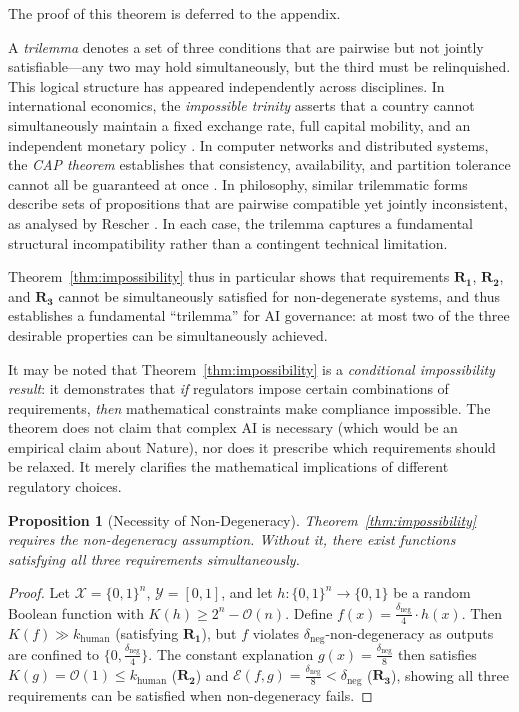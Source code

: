 \documentclass[11pt,letter,leqno]{article}
\newtheorem{proposition}[theorem]{Proposition}
\begin{document}
The proof of this theorem is deferred to the appendix.

A \emph{trilemma} denotes a set of three conditions that are pairwise but not jointly satisfiable---any two may hold simultaneously, but the third must be relinquished.  This logical structure has appeared independently across disciplines.  In international economics, the \emph{impossible trinity} asserts that a country cannot simultaneously maintain a fixed exchange rate, full capital mobility, and an independent monetary policy \cite{Mundell1963}.  In computer networks and distributed systems, the \emph{CAP theorem} establishes that consistency, availability, and partition tolerance cannot all be guaranteed at once \cite{GilbertLynch2002}.  In philosophy, similar trilemmatic forms describe sets of propositions that are pairwise compatible yet jointly inconsistent, as analysed by Rescher \cite{Rescher1980}.  In each case, the trilemma captures a fundamental structural incompatibility rather than a contingent technical limitation.

Theorem~\ref{thm:impossibility} thus in particular shows that requirements $\mathbf{R_1}$, $\mathbf{R_2}$, and
$\mathbf{R_3}$ cannot be simultaneously satisfied for non-degenerate
systems, and thus establishes a fundamental ``trilemma'' for AI governance: at most two of the three desirable properties can be simultaneously achieved.

It may be noted that Theorem~\ref{thm:impossibility} is a \emph{conditional impossibility result}: it demonstrates that \emph{if} regulators impose certain combinations of requirements, \emph{then} mathematical constraints make compliance impossible.  The theorem does not claim that complex AI is necessary (which would be an empirical claim about Nature), nor does it prescribe which requirements should be relaxed.  It merely clarifies the mathematical implications of different regulatory choices.

\begin{proposition}[Necessity of Non-Degeneracy]
\label{prop:necessity-brief}
Theorem~\ref{thm:impossibility} requires the non-degeneracy
assumption. Without it, there exist functions satisfying all three
requirements simultaneously.
\end{proposition}

\begin{proof}
Let $\mathcal{X} = \{0,1\}^n$, $\mathcal{Y} = [0,1]$, and let $h: \{0,1\}^n \to \{0,1\}$ 
be a random Boolean function with $K(h) \geq 2^n - \mathcal{O}(n)$. Define 
$f(x) = \frac{\delta_{\text{neg}}}{4} \cdot h(x)$. Then $K(f) \gg k_{\text{human}}$ 
(satisfying $\mathbf{R_1}$), but $f$ violates $\delta_{\text{neg}}$-non-degeneracy 
as outputs are confined to $\{0, \frac{\delta_{\text{neg}}}{4}\}$. The constant 
explanation $g(x) = \frac{\delta_{\text{neg}}}{8}$ then satisfies 
$K(g) = \mathcal{O}(1) \leq k_{\text{human}}$ ($\mathbf{R_2}$) and 
$\mathcal{E}(f,g) = \frac{\delta_{\text{neg}}}{8} < \delta_{\text{neg}}$ 
($\mathbf{R_3}$), showing all three requirements can be satisfied when non-degeneracy 
fails.
\end{proof}
\end{document}
